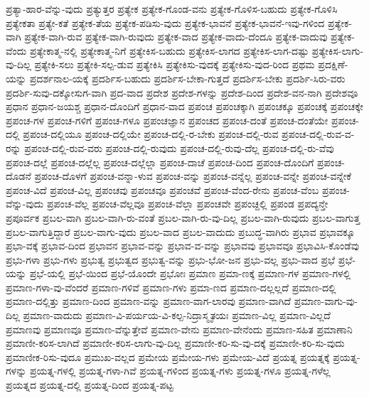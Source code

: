 {ಪ್ರತ್ಯಾ-ಹಾರ-ವೆನ್ನು-ವುದು
ಪ್ರತ್ಯುತ್ತರ
ಪ್ರತ್ಯೇಕ
ಪ್ರತ್ಯೇಕ-ಗೊಂಡ-ವನು
ಪ್ರತ್ಯೇಕ-ಗೊಳಿಸ-ಬಹುದು
ಪ್ರತ್ಯೇಕ-ಗೊಳಿಸಿ
ಪ್ರತ್ಯೇಕತಾ
ಪ್ರತ್ಯೇ-ಕತೆ
ಪ್ರತ್ಯೇಕ-ತೆಯ
ಪ್ರತ್ಯೇಕ-ಪಡಿಸು-ವುದು
ಪ್ರತ್ಯೇಕ-ಭಾವನೆ
ಪ್ರತ್ಯೇಕ-ಭಾವನೆ-ಇವು-ಗಳಿಂದ
ಪ್ರತ್ಯೇಕ-ವಾಗಿ
ಪ್ರತ್ಯೇಕ-ವಾಗಿ-ರುವ
ಪ್ರತ್ಯೇಕ-ವಾಗಿ-ರುವುದು
ಪ್ರತ್ಯೇಕ-ವಾದ
ಪ್ರತ್ಯೇಕ-ವಾದು-ದೆಂದೂ
ಪ್ರತ್ಯೇಕ-ವಾದುವು
ಪ್ರತ್ಯೇಕ-ವೆಂದು
ಪ್ರತ್ಯೇಕಾತ್ಮ-ನಲ್ಲಿ
ಪ್ರತ್ಯೇಕಾತ್ಮ-ನಿಗೆ
ಪ್ರತ್ಯೇಕಿಸ-ಬಹುದು
ಪ್ರತ್ಯೇಕಿಸ-ಲಾಗದ
ಪ್ರತ್ಯೇಕಿಸ-ಲಾಗ-ದಷ್ಟು
ಪ್ರತ್ಯೇಕಿಸ-ಲಾಗು-ವು-ದಿಲ್ಲ
ಪ್ರತ್ಯೇಕಿ-ಸಲು
ಪ್ರತ್ಯೇಕಿ-ಸಲ್ಪ-ಡುವ
ಪ್ರತ್ಯೇಕಿಸಿ
ಪ್ರತ್ಯೇಕಿಸು-ವುದಕ್ಕೆ
ಪ್ರತ್ಯೇಕಿಸು-ವುದ-ರಿಂದ
ಪ್ರಥಮ
ಪ್ರದಕ್ಷಿಣೆ-ಯನ್ನು
ಪ್ರದರ್ಶನಾಲ-ಯಕ್ಕೆ
ಪ್ರದರ್ಶಿಸ-ಬಹುದು
ಪ್ರದರ್ಶಿಸ-ಬೇಕಾ-ಗುತ್ತದೆ
ಪ್ರದರ್ಶಿಸ-ಬೇಕು
ಪ್ರದರ್ಶಿ-ಸಿರು-ವರು
ಪ್ರದರ್ಶಿ-ಸುವು-ದಕ್ಕೋಸುಗ-ವಾಗಿ
ಪ್ರದ-ವಾದ
ಪ್ರದೇಶ
ಪ್ರದೇಶ-ಗಳನ್ನು
ಪ್ರದೇಶ-ದಿಂದ
ಪ್ರದೇಶ-ವನ-ನಾಗಿ
ಪ್ರದೇಶವೂ
ಪ್ರಧಾನ
ಪ್ರಧಾನ-ಜಯಶ್ಚ
ಪ್ರಧಾನ-ದೊಂದಿಗೆ
ಪ್ರಧಾನ-ವಾದ
ಪ್ರಪಂಚ
ಪ್ರಪಂಚಕ್ಕಾಗಿ
ಪ್ರಪಂಚಕ್ಕೂ
ಪ್ರಪಂಚಕ್ಕೆ
ಪ್ರಪಂಚಕ್ಕೇ
ಪ್ರಪಂಚ-ಗಳ
ಪ್ರಪಂಚ-ಗಳಿಗೆ
ಪ್ರಪಂಚ-ಗಳೂ
ಪ್ರಪಂಚಜ್ಞಾನ
ಪ್ರಪಂಚದ
ಪ್ರಪಂಚ-ದಂತೆ
ಪ್ರಪಂಚ-ದಂತೆಯೇ
ಪ್ರಪಂಚ-ದಲ್ಲಿ
ಪ್ರಪಂಚ-ದಲ್ಲಿಯೂ
ಪ್ರಪಂಚ-ದಲ್ಲಿಯೇ
ಪ್ರಪಂಚ-ದಲ್ಲಿ-ರ-ಬೇಕು
ಪ್ರಪಂಚ-ದಲ್ಲಿ-ರುವ
ಪ್ರಪಂಚ-ದಲ್ಲಿ-ರುವ-ವ-ರನ್ನು
ಪ್ರಪಂಚ-ದಲ್ಲಿ-ರುವ-ವರು
ಪ್ರಪಂಚ-ದಲ್ಲಿ-ರುವುದು
ಪ್ರಪಂಚ-ದಲ್ಲಿ-ರುವು-ದೆಲ್ಲ
ಪ್ರಪಂಚ-ದಲ್ಲಿ-ರು-ವೆವು
ಪ್ರಪಂಚ-ದಲ್ಲೆ
ಪ್ರಪಂಚ-ದಲ್ಲೆಲ್ಲ
ಪ್ರಪಂಚ-ದಲ್ಲೆಲ್ಲಾ
ಪ್ರಪಂಚ-ದಾಚೆ
ಪ್ರಪಂಚ-ದಿಂದ
ಪ್ರಪಂಚ-ದೊಂದಿಗೆ
ಪ್ರಪಂಚ-ದೊಡನೆ
ಪ್ರಪಂಚ-ದೊಳಗೆ
ಪ್ರಪಂಚ-ವನ್ನಾ-ಳುವ
ಪ್ರಪಂಚ-ವನ್ನು
ಪ್ರಪಂಚ-ವನ್ನೆಲ್ಲ
ಪ್ರಪಂಚ-ವನ್ನೇ
ಪ್ರಪಂಚ-ವನ್ನೇಕೆ
ಪ್ರಪಂಚ-ವಿದೆ
ಪ್ರಪಂಚ-ವಿಲ್ಲ
ಪ್ರಪಂಚವು
ಪ್ರಪಂಚವೂ
ಪ್ರಪಂಚವೆ
ಪ್ರಪಂಚ-ವೆಂದ-ರೇನು
ಪ್ರಪಂಚ-ವೆಂಬ
ಪ್ರಪಂಚ-ವೆನ್ನು-ವುದು
ಪ್ರಪಂಚ-ವೆಲ್ಲ
ಪ್ರಪಂಚ-ವೆಲ್ಲವೂ
ಪ್ರಪಂಚ-ವೆಲ್ಲಾ
ಪ್ರಪಂಚವೇ
ಪ್ರಪಂಚ್ದಲ್ಲಿ
ಪ್ರಪಂಡ
ಪ್ರಪದ್ಯನ್ತೇ
ಪ್ರಪೂರ್ವಕ
ಪ್ರಬಲ-ವಾಗಿ
ಪ್ರಬಲ-ವಾಗಿ-ರು-ವಂತೆ
ಪ್ರಬಲ-ವಾಗಿ-ರು-ವು-ದಿಲ್ಲ
ಪ್ರಬಲ-ವಾಗಿ-ರುವುದು
ಪ್ರಬಲ-ವಾಗುತ್ತ
ಪ್ರಬಲ-ವಾಗುತ್ತಿದ್ದಾರೆ
ಪ್ರಬಲ-ವಾಗು-ವುದು
ಪ್ರಬಲ-ವಾದ
ಪ್ರಬಲ-ವಾದುದು
ಪ್ರಬುದ್ಧ-ವಾಗಿರು
ಪ್ರಭಾವ
ಪ್ರಭಾವಕ್ಕೂ
ಪ್ರಭಾ-ವಕ್ಕೆ
ಪ್ರಭಾವ-ದಿಂದ
ಪ್ರಭಾವನ
ಪ್ರಭಾವ-ವನ್ನು
ಪ್ರಭಾವ-ವ-ವನ್ನು
ಪ್ರಭಾವವು
ಪ್ರಭಾವವೂ
ಪ್ರಭಾವಿಸಿ-ಕೊಂಡೆವು
ಪ್ರಭು-ಗಳಾ
ಪ್ರಭು-ಗಳು
ಪ್ರಭುತ್ವ
ಪ್ರಭುತ್ವದ
ಪ್ರಭುತ್ವ-ವನ್ನು
ಪ್ರಭು-ಭೋ-ಜನ
ಪ್ರಭು-ವಲ್ಲ
ಪ್ರಭು-ವಾದ
ಪ್ರಭೆ
ಪ್ರಭೆ-ಯನ್ನು
ಪ್ರಭೆ-ಯಲ್ಲಿ
ಪ್ರಭೆ-ಯಿಂದ
ಪ್ರಭೆ-ಯೊಂದೇ
ಪ್ರಭೋಃ
ಪ್ರಮಾಣ
ಪ್ರಮಾ-ಣಕ್ಕೆ
ಪ್ರಮಾಣ-ಗಳ
ಪ್ರಮಾಣ-ಗಳಲ್ಲಿ
ಪ್ರಮಾಣ-ಗಳಾ-ವು-ವೆಂದರೆ
ಪ್ರಮಾಣ-ಗಳಿವೆ
ಪ್ರಮಾಣ-ಗಳು
ಪ್ರಮಾ-ಣದ
ಪ್ರಮಾಣ-ದಲ್ಲಲ್ಲದೆ
ಪ್ರಮಾಣ-ದಲ್ಲಿ
ಪ್ರಮಾಣ-ದಲ್ಲಿತ್ತು
ಪ್ರಮಾಣ-ದಿಂದ
ಪ್ರಮಾಣ-ವನ್ನು
ಪ್ರಮಾಣ-ವಾಗ-ಲಾರವು
ಪ್ರಮಾಣ-ವಾಗಿದೆ
ಪ್ರಮಾಣ-ವಾಗು-ವು-ದಿಲ್ಲ
ಪ್ರಮಾಣ-ವಾದುದು
ಪ್ರಮಾಣ-ವಿ-ಪರ್ಯಯ-ವಿ-ಕಲ್ಪ-ನಿದ್ರಾಸ್ಮೃತಯಃ
ಪ್ರಮಾಣ-ವಿಲ್ಲ
ಪ್ರಮಾಣ-ವಿಲ್ಲದೆ
ಪ್ರಮಾಣವು
ಪ್ರಮಾಣವೂ
ಪ್ರಮಾಣ-ವೆನ್ನುತ್ತೇವೆ
ಪ್ರಮಾಣ-ವೇನು
ಪ್ರಮಾಣ-ವೇನೆಂದು
ಪ್ರಮಾಣ-ಸಹಿತ
ಪ್ರಮಾಣಾನಿ
ಪ್ರಮಾಣೀ-ಕರಿಸ-ಲಾಗಿದೆ
ಪ್ರಮಾಣೀ-ಕರಿಸ-ಲಾಗು-ವು-ದಿಲ್ಲ
ಪ್ರಮಾಣೀ-ಕರಿ-ಸು-ವು-ದಕ್ಕೆ
ಪ್ರಮಾಣೀ-ಕರಿ-ಸು-ವುದು
ಪ್ರಮಾಣೀಕ-ರಿಸು-ವುದೂ
ಪ್ರಮುಖ-ವಲ್ಲದ
ಪ್ರಮೇಯ
ಪ್ರಮೇಯ-ಗಳು
ಪ್ರಮೇಯ-ವಿದೆ
ಪ್ರಯತ್ನ
ಪ್ರಯತ್ನಕ್ಕೆ
ಪ್ರಯತ್ನ-ಗಳನ್ನು
ಪ್ರಯತ್ನ-ಗಳಲ್ಲಿ
ಪ್ರಯತ್ನ-ಗಳಾ-ಗಿವೆ
ಪ್ರಯತ್ನ-ಗಳಿಂದ
ಪ್ರಯತ್ನ-ಗಳು
ಪ್ರಯತ್ನ-ಗಳೂ
ಪ್ರಯತ್ನ-ಗಳೆಲ್ಲ
ಪ್ರಯತ್ನದ
ಪ್ರಯತ್ನ-ದಲ್ಲಿ
ಪ್ರಯತ್ನ-ದಿಂದ
ಪ್ರಯತ್ನ-ಪಟ್ಟ
}
